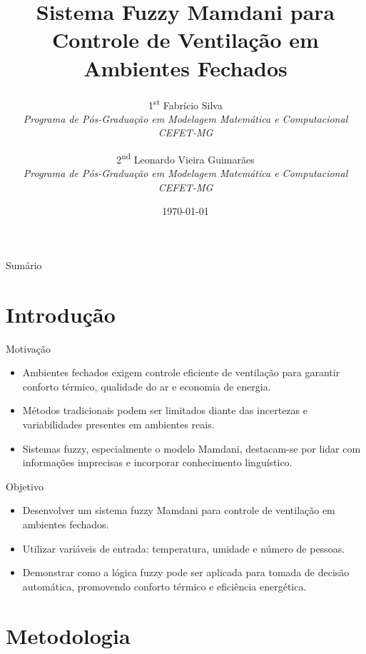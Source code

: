 \documentclass[aspectratio=169]{beamer}
\title[Sistema Fuzzy Mamdani]{Sistema Fuzzy Mamdani para Controle de Ventilação em Ambientes Fechados}
\author[Fabrício Silva, Leonardo Vieira Guimarães]{
    1\textsuperscript{st} Fabrício Silva \\
    \textit{Programa de Pós-Graduação em Modelagem Matemática e Computacional} \\
    \textit{CEFET-MG}
    \and
    2\textsuperscript{nd} Leonardo Vieira Guimarães \\
    \textit{Programa de Pós-Graduação em Modelagem Matemática e Computacional} \\
    \textit{CEFET-MG}
}
\institute[CEFET-MG]{Programa de Pós-Graduação em Modelagem Matemática e Computacional, CEFET-MG}
\date{\today}
\begin{document}
\begin{frame}
    \titlepage
\end{frame}

\begin{frame}{Sumário}
    \tableofcontents
\end{frame}

\section{Introdução}

\begin{frame}{Motivação}
    \begin{itemize}
        \item Ambientes fechados exigem controle eficiente de ventilação para garantir conforto térmico, qualidade do ar e economia de energia.
        \item Métodos tradicionais podem ser limitados diante das incertezas e variabilidades presentes em ambientes reais.
        \item Sistemas fuzzy, especialmente o modelo Mamdani, destacam-se por lidar com informações imprecisas e incorporar conhecimento linguístico.
    \end{itemize}
\end{frame}

\begin{frame}{Objetivo}
    \begin{itemize}
        \item Desenvolver um sistema fuzzy Mamdani para controle de ventilação em ambientes fechados.
        \item Utilizar variáveis de entrada: temperatura, umidade e número de pessoas.
        \item Demonstrar como a lógica fuzzy pode ser aplicada para tomada de decisão automática, promovendo conforto térmico e eficiência energética.
    \end{itemize}
\end{frame}

\section{Metodologia}
\end{document}
